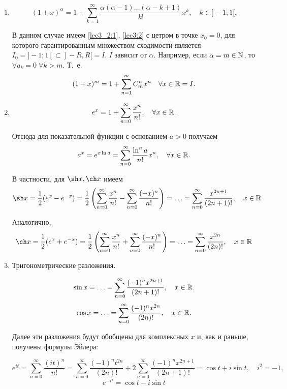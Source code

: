 \documentclass[../../main.tex]{subfiles}
\begin{document}
    \begin{enumerate}
        \item 
        \[(1 + x)^\alpha = 1 + \sum\limits_{k = 1}^{\infty} 
        \dfrac{\alpha(\alpha - 1)\ldots(\alpha - k + 1)}{k!}x^k, \quad k \in 
        ]-1; 1[.\]
        
        В данном случае имеем \eqref{lec3_2:1}, \eqref{lec3:2} с цетром в точке 
        $x_0 = 0$, для которого гарантированным множеством сходимости является 
        $I_0 = ]-1; 1[ \subset ]-R, R[ = I.$ $I$ зависит от $\alpha$. 
        Например, 
        если $\alpha = m \in \mathbb{N}$, то $\forall a_k = 0 \; \forall k > m$. Т.~е.
        \[(1 + x)^m = 1 + \sum\limits_{n = 1}^{m} C_m^n x^n \quad \forall x 
        \in \mathbb{R} = I.\]
        
        \item 
        \[e^x = 1 + \sum\limits_{n = 0}^{\infty} \frac{x^n}{n!},  \quad 
        \forall x \in \mathbb{R}.\]

        Отсюда для показательной функции с основанием $a > 0$ получаем
        \[ a^x = e^{x \ln a} = \sum\limits_{n = 0}^{\infty} 
        \frac{\ln^n a}{n!} x ^ n,  \quad \forall x \in \mathbb{R}.\]

        В частности, для $\sh x, \ch x$ имеем 
        \[\sh x = \frac12 (e^x - e^{-x}) = \frac12 
        \left(\sum\limits_{n = 0}^{\infty} \frac{x^n}{n!} - 
        \sum\limits_{n = 0}^{\infty} \frac{(-x)^n}{n!}\right) = \ldots =
        \sum\limits_{n = 0}^{\infty} \frac{x^{2n+1}}{(2n+1)!}, \quad x \in \R\]
    
        Аналогично,
        \[\ch x = \frac12 (e^x + e^{-x}) = \frac12 
        \left(\sum\limits_{n = 0}^{\infty} \frac{x^n}{n!} + 
        \sum\limits_{n = 0}^{\infty}\frac{(-x)^n}{n!}\right) = \ldots = 
        \sum\limits_{n = 0}^{\infty} \frac{x^{2n}}{(2n)!}, \quad x \in \R\]
    
        \item Тригонометрические разложения.
    
        \[\sin x = \ldots = \sum\limits_{n = 0}^{\infty} 
        \frac{(-1)^nx^{2n+1}}{(2n+1)!}, \quad x \in \mathbb{R}.\]
        \[\cos x = \ldots = \sum\limits_{n = 0}^{\infty} 
        \frac{(-1)^nx^{2n}}{(2n)!}, \quad x \in \mathbb{R}.\]
    
        Далее эти разложения будут обобщены для комплексных $x$ и, как 
        и раньше, получены формулы Эйлера:
    
        \[ e^{it} = \sum\limits_{n = 0}^{\infty} \frac{(it)^n}{n!} = 
        \sum\limits_{n = 0}^{\infty} \frac{(-1)^nt^{2n}}{(2n)!} + 
        2 \sum\limits_{n = 0}^{\infty} \frac{(-1)^nx^{2n+1}}{(2n+1)!} 
        = \cos t + i \sin t, \quad i^2 = -1,\]
        \[e^{-it} = \cos t - i \sin t\]


\end{enumerate}
\end{document}
